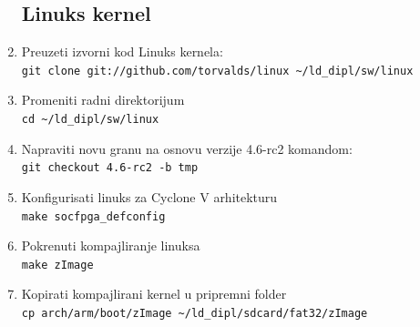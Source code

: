 \begin{enumerate}
\subsection{Linuks kernel}
\item Preuzeti izvorni kod Linuks kernela:\\
\texttt{git clone git://github.com/torvalds/linux \textasciitilde/ld\_dipl/sw/linux}
\item Promeniti radni direktorijum\\
\texttt{cd \textasciitilde/ld\_dipl/sw/linux}
\item Napraviti novu granu na osnovu verzije 4.6-rc2 komandom:\\ \texttt{git checkout 4.6-rc2 -b tmp}
\item Konfigurisati linuks za Cyclone V arhitekturu\\
\texttt{make socfpga\_defconfig}
\item Pokrenuti kompajliranje linuksa\\
\texttt{make zImage}
\item Kopirati kompajlirani kernel u pripremni folder\\
\texttt{cp arch/arm/boot/zImage \textasciitilde/ld\_dipl/sdcard/fat32/zImage}



\end{enumerate}
